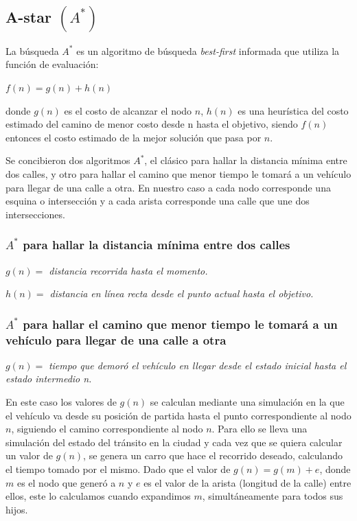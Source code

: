 \documentclass[colorinlistoftodos,twoside,twocolumn]{article} %
\begin{document}
	
	\subsection{A-star $(A^{*}) $}
	
	La b\'usqueda $ A^{*} $ es un algoritmo de búsqueda \textit{best-first} informada que utiliza la función de evaluación:
	\begin{center}
		$ f(n) = g(n) + h(n) $
	\end{center}
	donde $ g(n) $ es el costo de alcanzar el nodo $ n $, $ h(n) $ es una heur\'istica del costo estimado del camino de menor costo desde n hasta el objetivo, siendo $ f(n) $ entonces el costo estimado de la mejor soluci\'on que pasa por $ n $.
	
	Se concibieron dos algoritmos $ A^{*} $, el cl\'asico para hallar la distancia m\'inima entre dos calles, y otro para hallar el camino que menor tiempo le tomar\'a a un veh\'iculo para llegar de una calle a otra. En nuestro caso a cada nodo corresponde una esquina o intersecci\'on y a cada arista corresponde una calle que une dos intersecciones.
	
	\subsubsection{$ A^{*} $ para hallar la distancia m\'inima entre dos calles}
	
	\begin{center}
	
	\textit{$ g(n) = $ distancia recorrida hasta el momento.}
	
	\vspace{0.5em}
	\textit{$ h(n) = $ distancia en l\'inea recta desde el punto actual hasta el objetivo.}
	
	\end{center}
	
	\subsubsection{$ A^{*} $ para hallar el camino que menor tiempo le tomar\'a a un veh\'iculo para llegar de una calle a otra}
	
	\begin{center}
		\textit{$ g(n) = $ } \textit{tiempo que demor\'o el veh\'iculo en llegar desde el estado inicial hasta el \hspace{8em} estado intermedio n.}
	\end{center}	

	En este caso los valores de $g(n)$ se calculan mediante una simulaci\'on en la que el veh\'iculo va desde su posici\'on de partida hasta el punto correspondiente al nodo $n$, siguiendo el camino correspondiente al nodo $n$. Para ello se lleva una simulaci\'on del estado del tr\'ansito en la ciudad y cada vez que se quiera calcular un valor de $g(n)$, se genera un carro que hace el recorrido deseado, calculando el tiempo tomado por el mismo. Dado que el valor de $g(n) = g(m) + e$, donde $m$ es el nodo que gener\'o a $n$ y $e$ es el valor de la arista (longitud de la calle) entre ellos, este lo calculamos cuando expandimos $m$, simult\'aneamente para todos sus hijos.  
\end{document}
